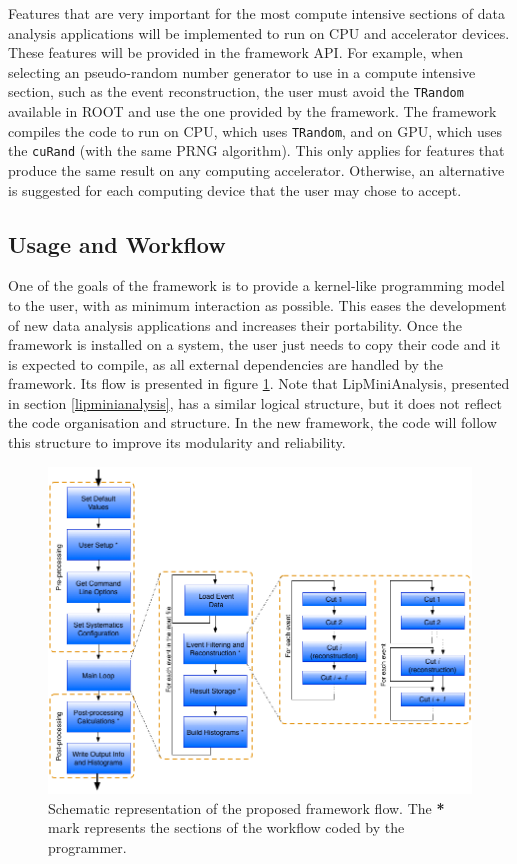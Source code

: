 Features that are very important for the most compute intensive sections of data analysis applications will be implemented to run on CPU and accelerator devices. These features will be provided in the framework API. For example, when selecting an pseudo-random number generator to use in a compute intensive section, such as the event reconstruction, the user must avoid the \texttt{TRandom} available in ROOT and use the one provided by the framework. The framework compiles the code to run on CPU, which uses \texttt{TRandom}, and on GPU, which uses the \texttt{cuRand} (with the same PRNG algorithm). This only applies for features that produce the same result on any computing accelerator. Otherwise, an alternative is suggested for each computing device that the user may chose to accept.

\subsection{Usage and Workflow}
\label{usage_workflow}

One of the goals of the framework is to provide a kernel-like programming model to the user, with as minimum interaction as possible. This eases the development of new data analysis applications and increases their portability. Once the framework is installed on a system, the user just needs to copy their code and it is expected to compile, as all external dependencies are handled by the framework. Its flow is presented in figure \ref{fig:new_framework_flow}. Note that LipMiniAnalysis, presented in section \ref{lipminianalysis}, has a similar logical structure, but it does not reflect the code organisation and structure. In the new framework, the code will follow this structure to improve its modularity and reliability.

\begin{figure}[!htp]
	\begin{center}
		\includegraphics[scale=0.5]{imgs/new_framework_flow.png}
		\caption{Schematic representation of the proposed framework flow. The \textbf{*} mark represents the sections of the workflow coded by the programmer.}
		\label{fig:new_framework_flow}
	\end{center}
\end{figure}

